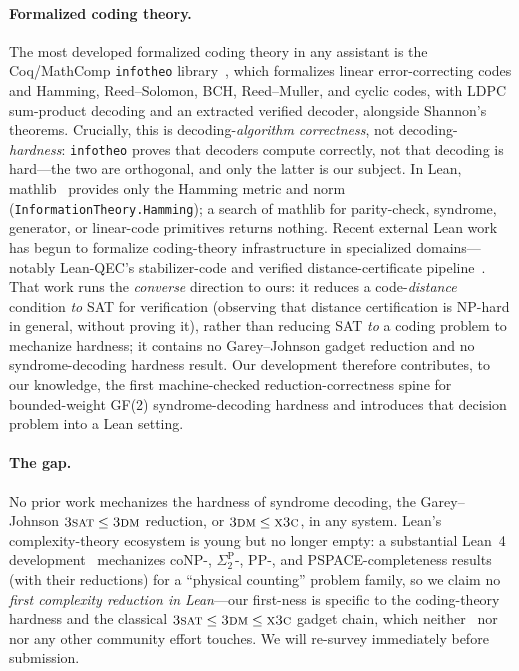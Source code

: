 \documentclass[a4paper,UKenglish,cleveref,autoref]{lipics-v2021}
\begin{document}
\paragraph*{Formalized coding theory.} The most developed formalized coding theory in any assistant is the
Coq/MathComp \lstinline{infotheo} library~\cite{AGS20}, which formalizes linear error-correcting codes and
Hamming, Reed--Solomon, BCH, Reed--Muller, and cyclic codes, with LDPC sum-product decoding and an extracted
verified decoder, alongside Shannon's theorems. Crucially, this is decoding-\emph{algorithm correctness}, not
decoding-\emph{hardness}: \lstinline{infotheo} proves that decoders compute correctly, not that decoding is
hard---the two are orthogonal, and only the latter is our subject. In Lean, mathlib~\cite{mathlib} provides only
the Hamming metric and norm (\lstinline{InformationTheory.Hamming}); a search of mathlib for parity-check,
syndrome,
generator, or linear-code primitives returns nothing. Recent external Lean work has begun to formalize
coding-theory infrastructure in specialized domains---notably Lean-QEC's stabilizer-code and verified
distance-certificate pipeline~\cite{ELWT26}. That work runs the \emph{converse} direction to ours: it reduces a
code-\emph{distance} condition \emph{to} SAT for verification (observing that distance certification is NP-hard
in general, without proving it), rather than reducing SAT \emph{to} a coding problem to mechanize hardness; it
contains no Garey--Johnson gadget reduction and no syndrome-decoding hardness result. Our development therefore
contributes, to our knowledge, the first machine-checked reduction-correctness spine for bounded-weight GF(2)
syndrome-decoding hardness and introduces that decision problem into a Lean setting.

\paragraph*{The gap.} No prior work mechanizes the hardness of syndrome decoding, the Garey--Johnson
$\textsc{3sat} \le \textsc{3dm}$ reduction, or $\textsc{3dm} \le \textsc{x3c}$, in any system. Lean's
complexity-theory ecosystem is young but no longer empty: a substantial Lean~4 development~\cite{Sim26}
mechanizes coNP-, $\Sigma_2^{\mathrm P}$-, PP-, and PSPACE-completeness results (with their reductions) for a
``physical counting'' problem family, so we claim no \emph{first complexity reduction in Lean}---our first-ness
is specific to the coding-theory hardness and the classical $\textsc{3sat} \le \textsc{3dm} \le \textsc{x3c}$
gadget chain, which neither~\cite{Sim26} nor~\cite{ELWT26} nor any other community effort touches. We will
re-survey immediately before submission.
\end{document}
